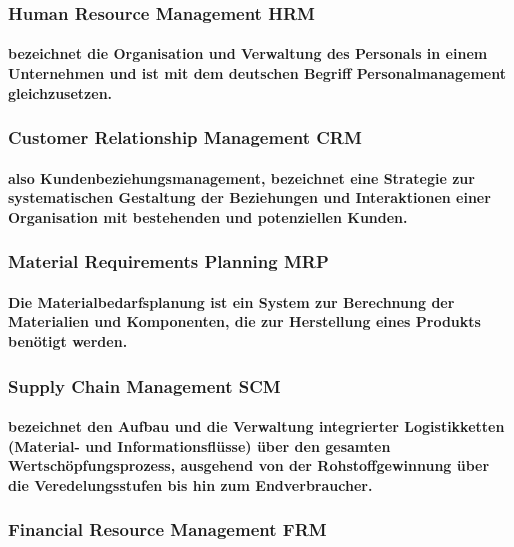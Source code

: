 \documentclass[a4paper]{article}
\begin{document}
    \subsubsection{\color{codegreen}Human Resource Management HRM}
    \paragraph{\color{codegreen}bezeichnet die Organisation und Verwaltung des Personals in einem Unternehmen und ist mit dem deutschen Begriff Personalmanagement gleichzusetzen.}
    \subsubsection{\color{codegreen}Customer Relationship Management CRM}
    \paragraph{\color{codegreen}also Kundenbeziehungsmanagement, bezeichnet eine Strategie zur systematischen Gestaltung der Beziehungen und Interaktionen einer Organisation mit bestehenden und potenziellen Kunden.}
    \subsubsection{\color{codegreen}Material Requirements Planning MRP}
    \paragraph{\color{codegreen}Die Materialbedarfsplanung ist ein System zur Berechnung der Materialien und Komponenten, die zur Herstellung eines Produkts benötigt werden.}
    \subsubsection{\color{codegreen}Supply Chain Management SCM}
    \paragraph{\color{codegreen} bezeichnet den Aufbau und die Verwaltung integrierter Logistikketten (Material- und Informationsflüsse) über den gesamten Wertschöpfungsprozess, ausgehend von der Rohstoffgewinnung über die Veredelungsstufen bis hin zum Endverbraucher.}
    \subsubsection{\color{codegreen}Financial Resource Management FRM}
\end{document}
